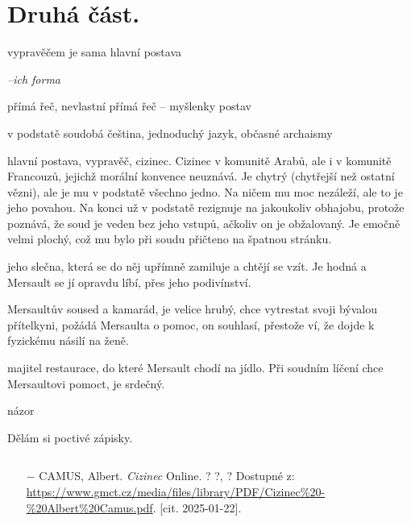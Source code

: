 \documentclass{article}
\begin{document}
\section{Druhá část.}
\begin{description}
    \setlength\itemsep{0.15em}
    \item[vypravěč:] vypravěčem je sama hlavní postava
    \item[vyprávěcí způsoby:] \textit{--ich forma}
    \item[typy promluv:] přímá řeč, nevlastní přímá řeč -- myšlenky postav
    \item[jazyková stránka:] v podstatě soudobá čeština, jednoduchý jazyk, občasné archaismy
    \item[postavy:]
        \begin{description}
            \setlength\itemsep{0.15em}
           	\item[Mersault,] hlavní postava, vypravěč, cizinec. Cizinec v komunitě Arabů, ale i v komunitě Francouzů, jejichž morální konvence
                neuznává. Je chytrý (chytřejší než ostatní vězni), ale je mu v podstatě všechno jedno. Na ničem mu moc nezáleží, ale to je
                jeho povahou. Na konci už v podstatě rezignuje na jakoukoliv obhajobu, protože poznává, že soud je veden bez jeho vstupů,
                ačkoliv on je obžalovaný. Je emočně velmi plochý, což mu bylo při soudu přičteno na špatnou stránku.
            \item[Marie,] jeho slečna, která se do něj upřímně zamiluje a chtějí se vzít. Je hodná a Mersault se jí opravdu líbí, přes
                jeho podivínství.
            \item[Raymond,] Mersaultův soused a kamarád, je velice hrubý, chce vytrestat svoji bývalou přítelkyni, požádá Mersaulta o pomoc,
                on souhlasí, přestože ví, že dojde k fyzickému násilí na ženě.
            \item[Céleste,] majitel restaurace, do které Mersault chodí na jídlo. Při soudním líčení chce Mersaultovi pomoct, je srdečný.
        \end{description}
    \item[názor:] názor
    \item[kontext:]  Dělám si poctivé zápisky.
    \item[zdroje:] $ $
    \begin{itemize}
        \setlength\itemsep{0em}
        \item[$-$] CAMUS, Albert. \textit{Cizinec} Online. ? ?, ? Dostupné z: \url{https://www.gmct.cz/media/files/library/PDF/Cizinec%20-%20Albert%20Camus.pdf}. [cit. 2025-01-22].
    \end{itemize}
\end{description}
\end{document}
